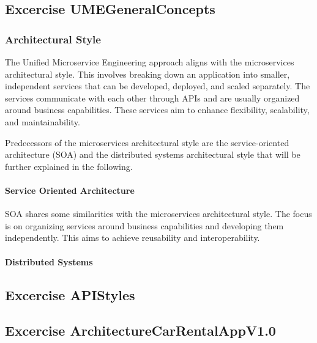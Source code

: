 \subsection{Excercise UMEGeneralConcepts}
\label{sec:ume_general_concepts}
\subsubsection*{Architectural Style}
The Unified Microservice Engineering approach aligns with the microservices architectural style.
This involves breaking down an application into smaller, independent services that can be developed, deployed, and scaled separately.
The services communicate with each other through APIs and are usually organized around business capabilities.
These services aim to enhance flexibility, scalability, and maintainability.

Predecessors of the microservices architectural style are the service-oriented architecture (SOA) and the distributed systems architectural style that will be further explained in the following.

\paragraph*{Service Oriented Architecture}
SOA shares some similarities with the microservices architectural style.
The focus is on organizing services around business capabilities and developing them independently.
This aims to achieve reusability and interoperability.


\paragraph*{Distributed Systems}

\subsection{Excercise APIStyles}
\label{sec:api_styles}

\subsection{Excercise ArchitectureCarRentalAppV1.0}
\label{sec:architecture_car_rental_app_v1_0}
